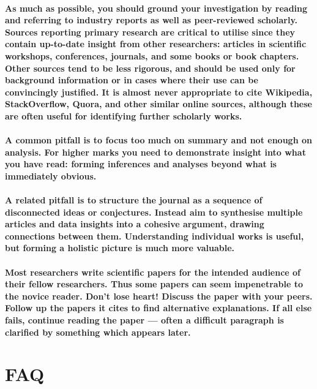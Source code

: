 \documentclass{../../fal_assignment}
\begin{document}
\paragraph{
As much as possible, you should ground your investigation by reading and referring to industry reports as 
well as peer-reviewed scholarly. Sources reporting primary research are critical to utilise since they contain
up-to-date insight from other researchers: articles in scientific workshops, conferences, journals, and some books or book chapters. 
Other sources tend to be less rigorous, and should be used only for background information
or in cases where their use can be convincingly justified.
It is almost never appropriate to cite Wikipedia, StackOverflow, Quora, and other similar online sources,
although these are often useful for identifying further scholarly works.
}

\paragraph{
A common pitfall is to focus too much on summary and not enough on analysis.
For higher marks you need to demonstrate \textbf{insight} into what you have read:
forming inferences and analyses beyond what is immediately obvious.
}

\paragraph{
A related pitfall is to structure the journal as a sequence of disconnected ideas or conjectures.
Instead aim to \textbf{synthesise} multiple articles and data insights into a cohesive argument,
drawing connections between them. Understanding individual works is useful, but forming a holistic picture is much more valuable.
}

\paragraph{
Most researchers write scientific papers for the intended audience of their fellow researchers.
Thus some papers can seem impenetrable to the novice reader.
Don't lose heart!
Discuss the paper with your peers.
Follow up the papers it cites to find alternative explanations.
If all else fails, continue reading the paper --- often a difficult paragraph is clarified by something which appears later.
}

\section*{FAQ}
\end{document}
